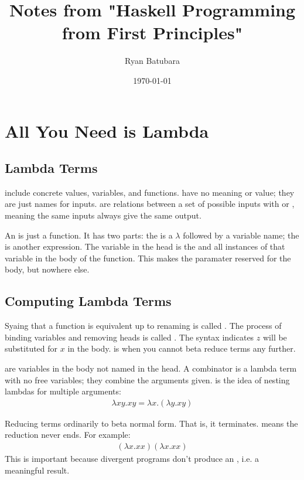 \documentclass{article}
\title{Notes from "Haskell Programming from First Principles"}
\author{Ryan Batubara}
\date{\today}
\begin{document}
\maketitle
\section{All You Need is Lambda}

\subsection{Lambda Terms}

 include concrete values, variables, and functions.  have no meaning or value; they are just names for inputs.  are relations between a set of possible inputs with  or , meaning the same inputs always give the same output. 

An  is just a function. It has two parts: the  is a $\lambda$ followed by a variable name; the  is another expression. The variable in the head is the  and  all instances of that variable in the body of the function. This makes the paramater reserved for the body, but nowhere else.

\subsection{Computing Lambda Terms}

Syaing that a function is equivalent up to renaming is called . The process of binding variables and removing heads is called . The syntax \term{[x := z]} indicates $z$ will be substituted for $x$ in the body.  is when you cannot beta reduce terms any further.

 are variables in the body not named in the head. A combinator is a lambda term with no free variables; they combine the arguments given.  is the idea of nesting lambdas for multiple arguments: 
\begin{align*}
    \lambda xy.xy = \lambda x.(\lambda y.xy)
\end{align*}

Reducing terms ordinarily  to beta normal form. That is, it terminates.  means the reduction never ends. For example:
\begin{align*}
    (\lambda x.xx)(\lambda x.xx)
\end{align*}
This is important because divergent programs don't produce an , i.e. a meaningful result.
\end{document}
